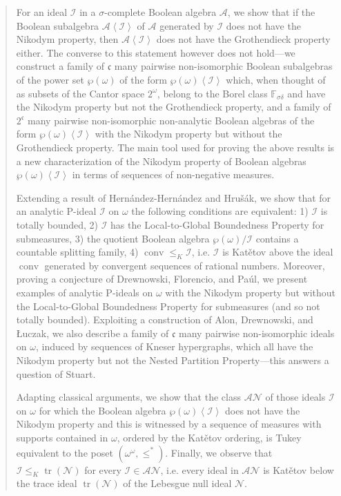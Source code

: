 \documentclass[a4paper,11pt,fleqn]{amsart}
\theoremstyle{definition}
\theoremstyle{remark}
\numberwithin{equation}{section}
\newcommand{\frakc}{\mathfrak{c}}
\newcommand{\N}{\mathbb{N}}
\newcommand{\F}{\mathbb{F}}
\newcommand{\aA}{\mathcal{A}}
\newcommand{\iI}{\mathcal{I}}
\newcommand{\nN}{\mathcal{N}}
\DeclareMathOperator{\conv}{{conv}}
\newcommand{\gen}[1]{\mathopen{}\left\langle#1\mathclose{}\right\rangle}
\newcommand{\wo}{{\wp(\omega)}}%
\newcommand{\oo}{\omega^\omega}%
\DeclareMathOperator{\tr}{tr}
\begin{document}
\begin{abstract}
For an ideal $\iI$ in a $\sigma$-complete Boolean algebra $\aA$, we show that if the Boolean subalgebra $\aA\gen{\iI}$ of $\aA$ generated by $\iI$ does not have the Nikodym property, then $\aA\gen{\iI}$ does not have the Grothendieck property either. The converse to this statement however does not hold---we construct a family of $\frakc$ many pairwise non-isomorphic Boolean subalgebras of the power set $\wo$ of the form $\wo\gen{\iI}$ which, when thought of as subsets of the Cantor space $2^\omega$, belong to the Borel class $\F_{\sigma\delta}$ and have the Nikodym property but not the Grothendieck property, and a family of $2^\frakc$ many pairwise non-isomorphic non-analytic Boolean algebras of the form $\wo\gen{\iI}$ with the Nikodym property but without the Grothendieck property. The main tool used for proving the above results is a new characterization of the Nikodym property of Boolean algebras $\wo\gen{\iI}$ in terms of sequences of non-negative measures.

Extending a result of Hern\'{a}ndez-Hern\'{a}ndez and Hru\v{s}\'{a}k, we show that for an analytic P-ideal $\iI$ on $\omega$ the following conditions are equivalent: 1) $\iI$ is totally bounded, 2) $\iI$ has the Local-to-Global Boundedness Property for submeasures, 3) the quotient Boolean algebra $\wo/\iI$ contains a countable splitting family, 4) $\conv\le_K\iI$, i.e. $\iI$ is Kat\v{e}tov above the ideal $\conv$ generated by convergent sequences of rational numbers. Moreover, proving a conjecture of Drewnowski, Florencio, and Pa\'ul, we present examples of analytic P-ideals on $\omega$ with the Nikodym property but without the Local-to-Global Boundedness Property for submeasures (and so not totally bounded). Exploiting a construction of Alon, Drewnowski, and \L uczak, we also describe a family of $\frakc$ many pairwise non-isomorphic ideals on $\omega$, induced by sequences of Kneser hypergraphs, which all have the Nikodym property but not the Nested Partition Property---this answers a question of Stuart.

Adapting classical arguments, we show that the class $\mathcal{AN}$ of those ideals $\iI$ on $\omega$ for which the Boolean algebra $\wo\gen{\iI}$ does not have the Nikodym property and this is witnessed by a sequence of measures with supports contained in $\omega$, ordered by the Kat\v{e}tov ordering, is Tukey equivalent to the poset $(\oo,\le^*)$. Finally, we observe that $\iI\le_K\tr(\nN)$ for every $\iI\in\mathcal{AN}$, i.e. every ideal in $\mathcal{AN}$ is Kat\v{e}tov below the trace ideal $\tr(\nN)$ of the Lebesgue null ideal $\nN$.
\end{abstract}
\end{document}
